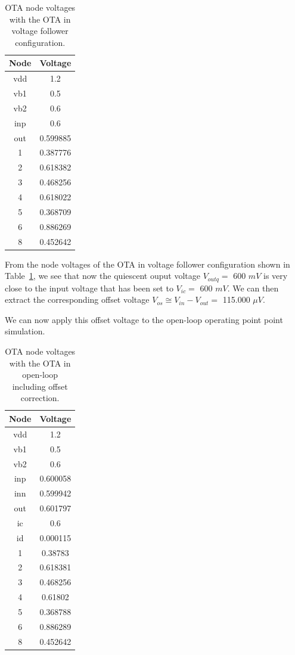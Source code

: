 \documentclass[
  a4paper,
  DIV=11,
  numbers=noendperiod]{scrreprt}
\begin{document}
\begin{longtable}[]{@{}cc@{}}

\caption{\label{tbl-ng_closedloop_voltages}OTA node voltages with the
OTA in voltage follower configuration.}

\tabularnewline

\toprule\noalign{}
Node & Voltage \\
\midrule\noalign{}
\endhead
\bottomrule\noalign{}
\endlastfoot
vdd & 1.2 \\
vb1 & 0.5 \\
vb2 & 0.6 \\
inp & 0.6 \\
out & 0.599885 \\
1 & 0.387776 \\
2 & 0.618382 \\
3 & 0.468256 \\
4 & 0.618022 \\
5 & 0.368709 \\
6 & 0.886269 \\
8 & 0.452642 \\

\end{longtable}

From the node voltages of the OTA in voltage follower configuration
shown in Table~\ref{tbl-ng_closedloop_voltages}, we see that now the
quiescent ouput voltage \(V_{outq} =\) 600 \(mV\) is very close to the
input voltage that has been set to \(V_{ic} =\) 600 \(mV\). We can then
extract the corresponding offset voltage
\(V_{os} \cong V_{in} - V_{out} =\) 115.000 \(\mu V\).

We can now apply this offset voltage to the open-loop operating point
point simulation.

\begin{longtable}[]{@{}cc@{}}

\caption{\label{tbl-ng_openloop_voltages2}OTA node voltages with the OTA
in open-loop including offset correction.}

\tabularnewline

\toprule\noalign{}
Node & Voltage \\
\midrule\noalign{}
\endhead
\bottomrule\noalign{}
\endlastfoot
vdd & 1.2 \\
vb1 & 0.5 \\
vb2 & 0.6 \\
inp & 0.600058 \\
inn & 0.599942 \\
out & 0.601797 \\
ic & 0.6 \\
id & 0.000115 \\
1 & 0.38783 \\
2 & 0.618381 \\
3 & 0.468256 \\
4 & 0.61802 \\
5 & 0.368788 \\
6 & 0.886289 \\
8 & 0.452642 \\

\end{longtable}
\end{document}
